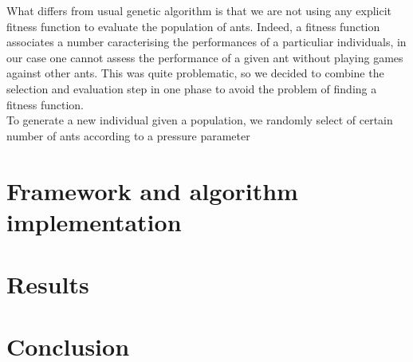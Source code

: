 \documentclass[10pt,a4paper]{article}
\begin{document}
What differs from usual genetic algorithm is that we are not using any
explicit fitness function to evaluate the population of ants. Indeed,
a fitness function associates a number caracterising the performances
of a particuliar individuals, in our case one cannot assess the
performance of a given ant without playing games against other
ants. This was quite problematic, so we decided to combine the
selection and evaluation step in one phase to avoid the problem of
finding a fitness function.\\

To generate a new individual given a population, we randomly select of
certain number of ants according to a pressure parameter





\section{Framework and algorithm implementation}

\section{Results}

\section*{Conclusion}
\end{document}
